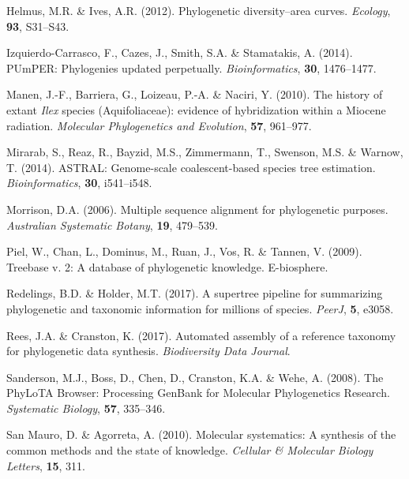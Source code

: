 \documentclass[]{article}
\begin{document}
\leavevmode\hypertarget{ref-helmus2012phylogenetic}{}%
Helmus, M.R. \& Ives, A.R. (2012). Phylogenetic diversity--area curves. \emph{Ecology}, \textbf{93}, S31--S43.

\leavevmode\hypertarget{ref-izquierdo2014pumper}{}%
Izquierdo-Carrasco, F., Cazes, J., Smith, S.A. \& Stamatakis, A. (2014). PUmPER: Phylogenies updated perpetually. \emph{Bioinformatics}, \textbf{30}, 1476--1477.

\leavevmode\hypertarget{ref-manen2010history}{}%
Manen, J.-F., Barriera, G., Loizeau, P.-A. \& Naciri, Y. (2010). The history of extant \emph{Ilex} species (Aquifoliaceae): evidence of hybridization within a Miocene radiation. \emph{Molecular Phylogenetics and Evolution}, \textbf{57}, 961--977.

\leavevmode\hypertarget{ref-mirarab2014astral}{}%
Mirarab, S., Reaz, R., Bayzid, M.S., Zimmermann, T., Swenson, M.S. \& Warnow, T. (2014). ASTRAL: Genome-scale coalescent-based species tree estimation. \emph{Bioinformatics}, \textbf{30}, i541--i548.

\leavevmode\hypertarget{ref-morrison2006multiple}{}%
Morrison, D.A. (2006). Multiple sequence alignment for phylogenetic purposes. \emph{Australian Systematic Botany}, \textbf{19}, 479--539.

\leavevmode\hypertarget{ref-piel2009treebase}{}%
Piel, W., Chan, L., Dominus, M., Ruan, J., Vos, R. \& Tannen, V. (2009). Treebase v. 2: A database of phylogenetic knowledge. E-biosphere.

\leavevmode\hypertarget{ref-redelings2017supertree}{}%
Redelings, B.D. \& Holder, M.T. (2017). A supertree pipeline for summarizing phylogenetic and taxonomic information for millions of species. \emph{PeerJ}, \textbf{5}, e3058.

\leavevmode\hypertarget{ref-rees2017automated}{}%
Rees, J.A. \& Cranston, K. (2017). Automated assembly of a reference taxonomy for phylogenetic data synthesis. \emph{Biodiversity Data Journal}.

\leavevmode\hypertarget{ref-sanderson2008phylota}{}%
Sanderson, M.J., Boss, D., Chen, D., Cranston, K.A. \& Wehe, A. (2008). The PhyLoTA Browser: Processing GenBank for Molecular Phylogenetics Research. \emph{Systematic Biology}, \textbf{57}, 335--346.

\leavevmode\hypertarget{ref-san2010molecular}{}%
San Mauro, D. \& Agorreta, A. (2010). Molecular systematics: A synthesis of the common methods and the state of knowledge. \emph{Cellular \& Molecular Biology Letters}, \textbf{15}, 311.
\end{document}
